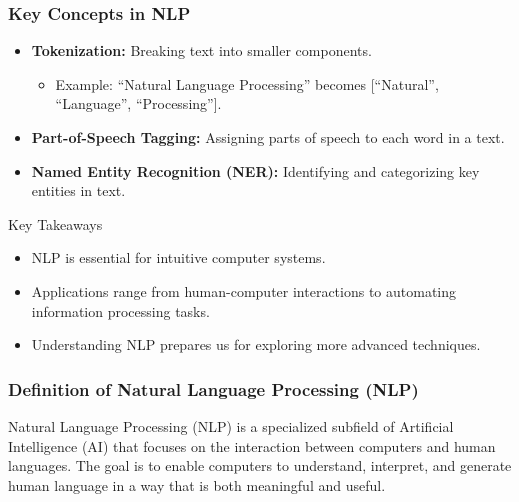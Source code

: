 \documentclass[aspectratio=169]{beamer}
\begin{document}
\begin{frame}[fragile]
    \frametitle{Key Concepts in NLP}
    
    \begin{itemize}
        \item \textbf{Tokenization:} Breaking text into smaller components.
        \begin{itemize}
            \item Example: “Natural Language Processing” becomes [“Natural”, “Language”, “Processing”].
        \end{itemize}
        
        \item \textbf{Part-of-Speech Tagging:} Assigning parts of speech to each word in a text.
        
        \item \textbf{Named Entity Recognition (NER):} Identifying and categorizing key entities in text.
    \end{itemize}
    
    \begin{block}{Key Takeaways}
        \begin{itemize}
            \item NLP is essential for intuitive computer systems.
            \item Applications range from human-computer interactions to automating information processing tasks.
            \item Understanding NLP prepares us for exploring more advanced techniques.
        \end{itemize}
    \end{block}
\end{frame}

\begin{frame}
    \titlepage
\end{frame}

\begin{frame}
    \frametitle{Definition of Natural Language Processing (NLP)}
    Natural Language Processing (NLP) is a specialized subfield of Artificial Intelligence (AI) that focuses on the interaction between computers and human languages. The goal is to enable computers to understand, interpret, and generate human language in a way that is both meaningful and useful.
\end{frame}
\end{document}
